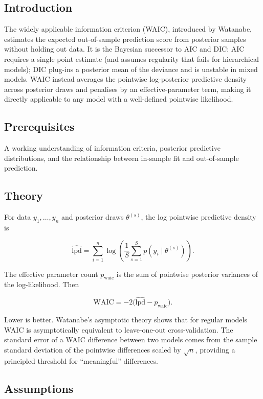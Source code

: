 \documentclass[
]{article}
\author{}
\date{\vspace{-2.5em}}
\begin{document}
\subsection{Introduction}\label{introduction}

The widely applicable information criterion (WAIC), introduced by
Watanabe, estimates the expected out-of-sample prediction score from
posterior samples without holding out data. It is the Bayesian successor
to AIC and DIC: AIC requires a single point estimate (and assumes
regularity that fails for hierarchical models); DIC plug-ins a posterior
mean of the deviance and is unstable in mixed models. WAIC instead
averages the pointwise log-posterior predictive density across posterior
draws and penalises by an effective-parameter term, making it directly
applicable to any model with a well-defined pointwise likelihood.

\subsection{Prerequisites}\label{prerequisites}

A working understanding of information criteria, posterior predictive
distributions, and the relationship between in-sample fit and
out-of-sample prediction.

\subsection{Theory}\label{theory}

For data \(y_1, \dots, y_n\) and posterior draws \(\theta^{(s)}\), the
log pointwise predictive density is

\[\widehat{\mathrm{lpd}} = \sum_{i=1}^n \log \!\left(\frac{1}{S} \sum_{s=1}^S p(y_i \mid \theta^{(s)})\right).\]

The effective parameter count \(p_{\text{waic}}\) is the sum of
pointwise posterior variances of the log-likelihood. Then

\[\mathrm{WAIC} = -2\bigl(\widehat{\mathrm{lpd}} - p_{\text{waic}}\bigr).\]

Lower is better. Watanabe's asymptotic theory shows that for regular
models WAIC is asymptotically equivalent to leave-one-out
cross-validation. The standard error of a WAIC difference between two
models comes from the sample standard deviation of the pointwise
differences scaled by \(\sqrt n\), providing a principled threshold for
``meaningful'' differences.

\subsection{Assumptions}\label{assumptions}
\end{document}
